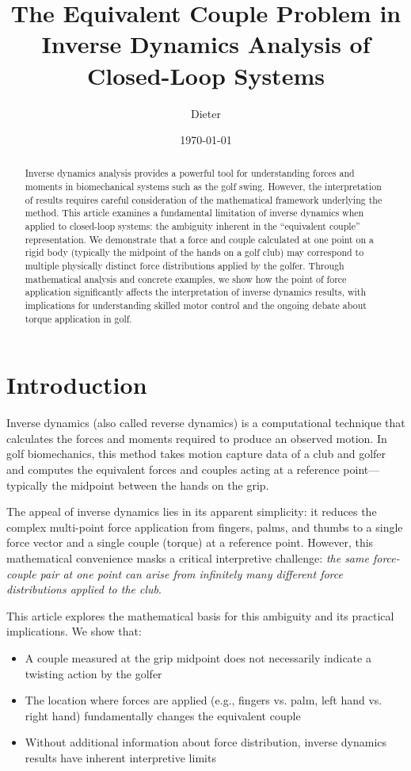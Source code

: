 \documentclass[11pt,a4paper]{article}
\title{\textbf{The Equivalent Couple Problem in Inverse Dynamics Analysis of Closed-Loop Systems}}
\author{Dieter}
\date{\today}
\begin{document}
\maketitle

\begin{abstract}
Inverse dynamics analysis provides a powerful tool for understanding forces and moments in biomechanical systems such as the golf swing. However, the interpretation of results requires careful consideration of the mathematical framework underlying the method. This article examines a fundamental limitation of inverse dynamics when applied to closed-loop systems: the ambiguity inherent in the ``equivalent couple'' representation. We demonstrate that a force and couple calculated at one point on a rigid body (typically the midpoint of the hands on a golf club) may correspond to multiple physically distinct force distributions applied by the golfer. Through mathematical analysis and concrete examples, we show how the point of force application significantly affects the interpretation of inverse dynamics results, with implications for understanding skilled motor control and the ongoing debate about torque application in golf.
\end{abstract}

\section{Introduction}

Inverse dynamics (also called reverse dynamics) is a computational technique that calculates the forces and moments required to produce an observed motion. In golf biomechanics, this method takes motion capture data of a club and golfer and computes the equivalent forces and couples acting at a reference point—typically the midpoint between the hands on the grip.

The appeal of inverse dynamics lies in its apparent simplicity: it reduces the complex multi-point force application from fingers, palms, and thumbs to a single force vector and a single couple (torque) at a reference point. However, this mathematical convenience masks a critical interpretive challenge: \emph{the same force-couple pair at one point can arise from infinitely many different force distributions applied to the club}.

This article explores the mathematical basis for this ambiguity and its practical implications. We show that:
\begin{itemize}
    \item A couple measured at the grip midpoint does not necessarily indicate a twisting action by the golfer
    \item The location where forces are applied (e.g., fingers vs. palm, left hand vs. right hand) fundamentally changes the equivalent couple
    \item Without additional information about force distribution, inverse dynamics results have inherent interpretive limits
\end{itemize}
\end{document}
